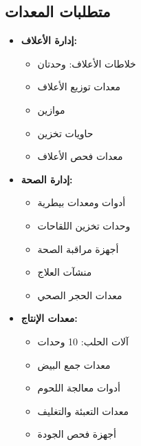 \subsection{متطلبات المعدات}
\begin{itemize}
    \item \textbf{إدارة الأعلاف:}
    \begin{itemize}
        \item خلاطات الأعلاف: وحدتان
        \item معدات توزيع الأعلاف
        \item موازين
        \item حاويات تخزين
        \item معدات فحص الأعلاف
    \end{itemize}
    
    \item \textbf{إدارة الصحة:}
    \begin{itemize}
        \item أدوات ومعدات بيطرية
        \item وحدات تخزين اللقاحات
        \item أجهزة مراقبة الصحة
        \item منشآت العلاج
        \item معدات الحجر الصحي
    \end{itemize}
    
    \item \textbf{معدات الإنتاج:}
    \begin{itemize}
        \item آلات الحلب: 10 وحدات
        \item معدات جمع البيض
        \item أدوات معالجة اللحوم
        \item معدات التعبئة والتغليف
        \item أجهزة فحص الجودة
    \end{itemize}
\end{itemize}

